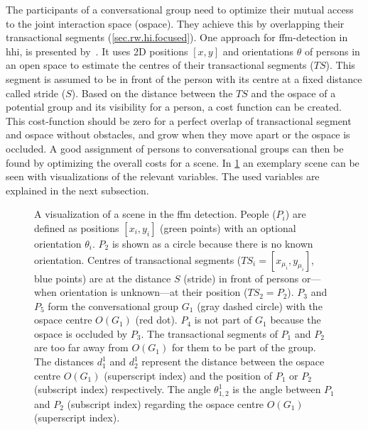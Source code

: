 The participants of a \gls{conversational group} need to optimize their mutual access to the joint interaction space (\gls{ospace}).
They achieve this by overlapping their \glspl{transactional segment} (\cref{sec.rw.hi.focused}).
One approach for \gls{ffm}-detection in \gls{hhi}, is presented by~.
It uses 2D positions \([x,y]\) and orientations \(\theta\) of persons in an open space to estimate the centres of their \glspl{transactional segment} (\(TS\)).
This segment is assumed to be in front of the person with its centre at a fixed distance called \gls{stride} (\(S\)).
Based on the distance between the \(TS\) and the \gls{ospace} of a potential group and its visibility for a person, a cost function can be created.
This cost-function should be zero for a perfect overlap of \gls{transactional segment} and \gls{ospace} without obstacles, and grow when they move apart or the \gls{ospace} is occluded.
A good assignment of persons to \glspl{conversational group} can then be found by optimizing the overall costs for a scene. 
In \cref{fig:ffm.approach} an exemplary scene can be seen with visualizations of the relevant variables.
The used variables are explained in the next subsection.
\begin{figure}[htbp!]
    \centering
    \def\svgwidth{1.0\textwidth}
    
    \caption[F-Formation detection scene.]{\label{fig:ffm.approach}
    A visualization of a scene in the \gls{ffm} detection.
    People (\(P_i\)) are defined as positions \([ x_i, y_i ]\) (green points) with an optional orientation \(\theta_i\).
    \(P_2\) is shown as a circle because there is no known orientation.
    Centres of \glspl{transactional segment} (\(TS_i = [x_{\mu_i},y_{\mu_i}]\), blue points) are at the distance \(S\) (\gls{stride}) in front of persons or---when orientation is unknown---at their position (\(TS_2=P_2\)).
    \(P_3\) and \(P_5\) form the \gls{conversational group} \(G_1\) (gray dashed circle) with the \gls{ospace} centre \(O(G_1)\) (red dot).
    \(P_4\) is not part of \(G_1\) because the \gls{ospace} is occluded by \(P_3\).
    The \glspl{transactional segment} of \(P_1\) and \(P_2\) are too far away from \(O(G_1)\) for them to be part of the group.
    The distances \(d^1_1\) and \(d^1_2\) represent the distance between the \gls{ospace} centre \(O(G_1)\) (superscript index) and the position of \(P_1\) or \(P_2\) (subscript index) respectively.
    The angle \(\theta^1_{1,2}\) is the angle between \(P_1\) and \(P_2\) (subscript index) regarding the \gls{ospace} centre \(O(G_1)\) (superscript index).
    }
\end{figure}

